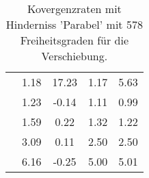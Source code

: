 \begin{table}
\begin{tabular}{c|cc|cc|}
\multicolumn{1}{|c|}{} & \multicolumn{1}{|c|}{      1.18} & \multicolumn{1}{|c|}{     17.23} & \multicolumn{1}{|c|}{      1.17} & \multicolumn{1}{|c|}{      5.63} \\ 
\multicolumn{1}{|c|}{} & \multicolumn{1}{|c|}{      1.23} & \multicolumn{1}{|c|}{     -0.14} & \multicolumn{1}{|c|}{      1.11} & \multicolumn{1}{|c|}{      0.99} \\ 
\multicolumn{1}{|c|}{} & \multicolumn{1}{|c|}{      1.59} & \multicolumn{1}{|c|}{      0.22} & \multicolumn{1}{|c|}{      1.32} & \multicolumn{1}{|c|}{      1.22} \\ 
\multicolumn{1}{|c|}{} & \multicolumn{1}{|c|}{      3.09} & \multicolumn{1}{|c|}{      0.11} & \multicolumn{1}{|c|}{      2.50} & \multicolumn{1}{|c|}{      2.50} \\ 
\multicolumn{1}{|c|}{} & \multicolumn{1}{|c|}{      6.16} & \multicolumn{1}{|c|}{     -0.25} & \multicolumn{1}{|c|}{      5.00} & \multicolumn{1}{|c|}{      5.01} \\ 
\hline 
\end{tabular}\caption{Kovergenzraten mit Hinderniss 'Parabel' mit 578 Freiheitsgraden für die Verschiebung.}\label{tab:Rate_Parabel_level3}
\end{table} 
